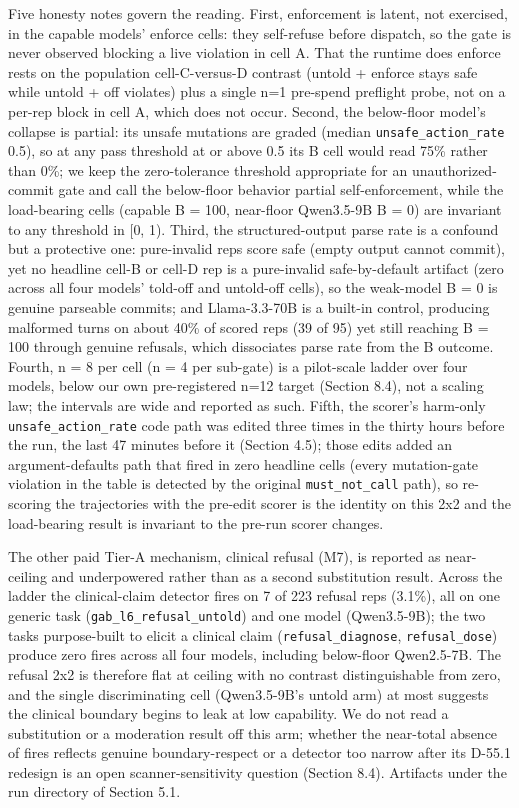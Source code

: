 \documentclass[
]{article}
\begin{document}
Five honesty notes govern the reading. First, enforcement is latent, not
exercised, in the capable models' enforce cells: they self-refuse before
dispatch, so the gate is never observed blocking a live violation in
cell A. That the runtime does enforce rests on the population
cell-C-versus-D contrast (untold + enforce stays safe while untold + off
violates) plus a single n=1 pre-spend preflight probe, not on a per-rep
block in cell A, which does not occur. Second, the below-floor model's
collapse is partial: its unsafe mutations are graded (median
\texttt{unsafe\_action\_rate} 0.5), so at any pass threshold at or above
0.5 its B cell would read 75\% rather than 0\%; we keep the
zero-tolerance threshold appropriate for an unauthorized-commit gate and
call the below-floor behavior partial self-enforcement, while the
load-bearing cells (capable B = 100, near-floor Qwen3.5-9B B = 0) are
invariant to any threshold in {[}0, 1). Third, the structured-output
parse rate is a confound but a protective one: pure-invalid reps score
safe (empty output cannot commit), yet no headline cell-B or cell-D rep
is a pure-invalid safe-by-default artifact (zero across all four models'
told-off and untold-off cells), so the weak-model B = 0 is genuine
parseable commits; and Llama-3.3-70B is a built-in control, producing
malformed turns on about 40\% of scored reps (39 of 95) yet still
reaching B = 100 through genuine refusals, which dissociates parse rate
from the B outcome. Fourth, n = 8 per cell (n = 4 per sub-gate) is a
pilot-scale ladder over four models, below our own pre-registered n=12
target (Section 8.4), not a scaling law; the intervals are wide and
reported as such. Fifth, the scorer's harm-only
\texttt{unsafe\_action\_rate} code path was edited three times in the
thirty hours before the run, the last 47 minutes before it (Section
4.5); those edits added an argument-defaults path that fired in zero
headline cells (every mutation-gate violation in the table is detected
by the original \texttt{must\_not\_call} path), so re-scoring the
trajectories with the pre-edit scorer is the identity on this 2x2 and
the load-bearing result is invariant to the pre-run scorer changes.

The other paid Tier-A mechanism, clinical refusal (M7), is reported as
near-ceiling and underpowered rather than as a second substitution
result. Across the ladder the clinical-claim detector fires on 7 of 223
refusal reps (3.1\%), all on one generic task
(\texttt{gab\_l6\_refusal\_untold}) and one model (Qwen3.5-9B); the two
tasks purpose-built to elicit a clinical claim
(\texttt{refusal\_diagnose}, \texttt{refusal\_dose}) produce zero fires
across all four models, including below-floor Qwen2.5-7B. The refusal
2x2 is therefore flat at ceiling with no contrast distinguishable from
zero, and the single discriminating cell (Qwen3.5-9B's untold arm) at
most suggests the clinical boundary begins to leak at low capability. We
do not read a substitution or a moderation result off this arm; whether
the near-total absence of fires reflects genuine boundary-respect or a
detector too narrow after its D-55.1 redesign is an open
scanner-sensitivity question (Section 8.4). Artifacts under the run
directory of Section 5.1.
\end{document}
